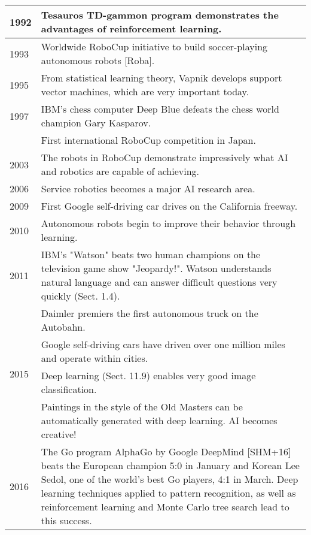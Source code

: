 \documentclass[10pt]{article}
\begin{document}
\begin{center}
\begin{tabular}{|l|l|}
\hline
1992 & Tesauros TD-gammon program demonstrates the advantages of reinforcement learning. \\
\hline
1993 & Worldwide RoboCup initiative to build soccer-playing autonomous robots [Roba]. \\
\hline
1995 & From statistical learning theory, Vapnik develops support vector machines, which are very important today. \\
\hline
1997 & IBM's chess computer Deep Blue defeats the chess world champion Gary Kasparov. \\
\hline
 & First international RoboCup competition in Japan. \\
\hline
2003 & The robots in RoboCup demonstrate impressively what AI and robotics are capable of achieving. \\
\hline
2006 & Service robotics becomes a major AI research area. \\
\hline
2009 & First Google self-driving car drives on the California freeway. \\
\hline
2010 & Autonomous robots begin to improve their behavior through learning. \\
\hline
2011 & IBM's "Watson" beats two human champions on the television game show "Jeopardy!". Watson understands natural language and can answer difficult questions very quickly (Sect. 1.4). \\
\hline
\multirow[t]{4}{*}{2015} & Daimler premiers the first autonomous truck on the Autobahn. \\
\hline
 & Google self-driving cars have driven over one million miles and operate within cities. \\
\hline
 & Deep learning (Sect. 11.9) enables very good image classification. \\
\hline
 & Paintings in the style of the Old Masters can be automatically generated with deep learning. AI becomes creative! \\
\hline
2016 & The Go program AlphaGo by Google DeepMind [SHM+16] beats the European champion 5:0 in January and Korean Lee Sedol, one of the world's best Go players, 4:1 in March. Deep learning techniques applied to pattern recognition, as well as reinforcement learning and Monte Carlo tree search lead to this success. \\
\hline
\end{tabular}
\end{center}
\end{document}
